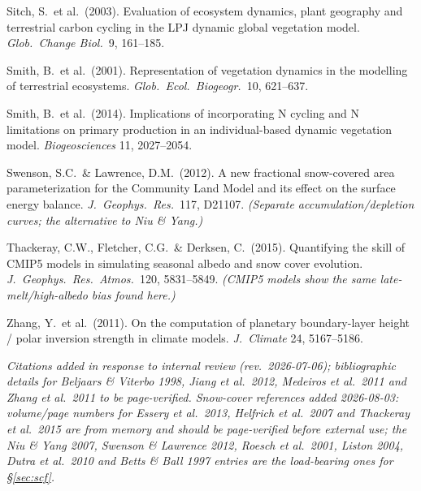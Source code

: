 \documentclass[10pt]{article}
\begin{document}
{Sitch, S.\ et al.\ (2003). Evaluation of ecosystem dynamics, plant geography and terrestrial carbon cycling in the
LPJ dynamic global vegetation model. \emph{Glob.\ Change Biol.}\ 9, 161--185.\par
Smith, B.\ et al.\ (2001). Representation of vegetation dynamics in the modelling of terrestrial ecosystems.
\emph{Glob.\ Ecol.\ Biogeogr.}\ 10, 621--637.\par
Smith, B.\ et al.\ (2014). Implications of incorporating N cycling and N limitations on primary production in an
individual-based dynamic vegetation model. \emph{Biogeosciences} 11, 2027--2054.\par
Swenson, S.C.\ \& Lawrence, D.M.\ (2012). A new fractional snow-covered area parameterization for the Community
Land Model and its effect on the surface energy balance. \emph{J.\ Geophys.\ Res.}\ 117, D21107.
\emph{(Separate accumulation/depletion curves; the alternative to Niu \& Yang.)}\par
Thackeray, C.W., Fletcher, C.G.\ \& Derksen, C.\ (2015). Quantifying the skill of CMIP5 models in simulating
seasonal albedo and snow cover evolution. \emph{J.\ Geophys.\ Res.\ Atmos.}\ 120, 5831--5849.
\emph{(CMIP5 models show the same late-melt/high-albedo bias found here.)}\par
Zhang, Y.\ et al.\ (2011). On the computation of planetary boundary-layer height / polar inversion strength in
climate models. \emph{J.\ Climate} 24, 5167--5186.\par
\vspace{2pt}\emph{Citations added in response to internal review (rev.\ 2026-07-06); bibliographic details for
Beljaars \& Viterbo 1998, Jiang et al.\ 2012, Medeiros et al.\ 2011 and Zhang et al.\ 2011 to be page-verified.
Snow-cover references added 2026-08-03: volume/page numbers for Essery et al.\ 2013, Helfrich et al.\ 2007 and
Thackeray et al.\ 2015 are from memory and should be page-verified before external use; the Niu \& Yang 2007,
Swenson \& Lawrence 2012, Roesch et al.\ 2001, Liston 2004, Dutra et al.\ 2010 and Betts \& Ball 1997 entries
are the load-bearing ones for \S\ref{sec:scf}.}
}
\end{document}
